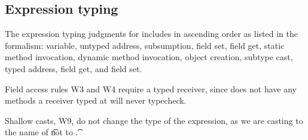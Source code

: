 \documentclass[acmlarge, anonymous, authordraft]{acmart}
\begin{document}
\begin{mathpar}

\end{mathpar}

\begin{mathpar}
\end{mathpar}
 
\begin{mathpar}

\end{mathpar}

\begin{mathpar}
\end{mathpar}

\subsection{Expression typing}

The expression typing judgments for \kafka includes in ascending order as listed in the formalism:
variable, untyped address, subsumption, field set, field get, static method invocation, dynamic method invocation, object creation,
subtype cast,
typed address,  field get, and  field set.

Field access rules W3 and W4 require a typed receiver, since \any does not
have any methods a receiver typed at \any will never typecheck.

Shallow casts, W9, do not change the type of the expression, as we are casting
to the name of \t not to \t.  
\end{document}
